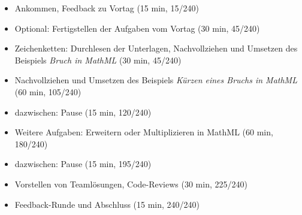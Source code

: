 \begin{itemize}
	\item Ankommen, Feedback zu Vortag (15 min, 15/240)
	\item Optional: Fertigstellen der Aufgaben vom Vortag (30 min, 45/240)
	\item Zeichenketten: Durchlesen der Unterlagen, Nachvollziehen und Umsetzen des Beispiels \textit{Bruch in MathML} (30 min, 45/240)
	\item Nachvollziehen und Umsetzen des Beispiels \textit{Kürzen eines Bruchs in MathML} (60 min, 105/240)
	\item dazwischen: Pause (15 min, 120/240)
	\item Weitere Aufgaben: Erweitern oder Multiplizieren in MathML (60 min, 180/240)
	\item dazwischen: Pause (15 min, 195/240)
	\item Vorstellen von Teamlösungen, Code-Reviews (30 min, 225/240)
	\item Feedback-Runde und Abschluss (15 min, 240/240)	
\end{itemize}